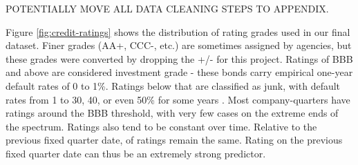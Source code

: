 \documentclass{article}[11pt]
\begin{document}
    POTENTIALLY MOVE ALL DATA CLEANING STEPS TO APPENDIX.

    Figure \ref{fig:credit-ratings} shows the distribution of rating grades used in our final dataset. Finer grades (AA+, CCC-, etc.) are sometimes assigned by agencies, but these grades were converted by dropping the +/- for this project. Ratings of BBB and above are considered investment grade - these bonds carry empirical one-year default rates of 0 to 1\%. Ratings below that are classified as junk, with default rates from 1 to 30, 40, or even 50\% for some years \citep{s_and_p_global_ratings_s_2024}. Most company-quarters have ratings around the BBB threshold, with very few cases on the extreme ends of the spectrum. Ratings also tend to be constant over time. Relative to the previous fixed quarter date, \shareNotChanges \space of ratings remain the same. Rating on the previous fixed quarter date can thus be an extremely strong predictor.
\end{document}
